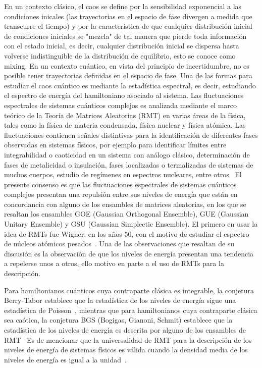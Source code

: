 \documentclass[spanish,titlepage,table]{practicas}
\begin{document}
En un contexto clásico, el caos se define por la sensibilidad exponencial a las condiciones inicales 
(las trayectorias en el espacio de fase divergen a medida que transcurre el tiempo) y por la característica de que cualquier distribución inicial de condiciones 
iniciales se "mezcla" de tal manera que pierde toda información con el estado inicial, es decir, cualquier distribución inicial se dispersa hasta volverse indistinguible de la distribución de equilibrio, esto se conoce como mixing. En un contexto cuántico, en vista del principio de incertidumbre, no es posible tener 
trayectorias definidas en el espacio de fase. Una de las formas para estudiar el caos cuántico es mediante la estadística espectral, es decir, estudiando el espectro de energía del hamiltoniano asociado al sistema.
Las fluctuaciones espectrales de sistemas cuánticos complejos es analizada mediante 
el marco teórico de la Teoría de Matrices Aleatorias (RMT) en varias áreas de la física, 
tales como la física de materia condensada, física nuclear y física atómica.
Las fluctuaciones contienen señales distintivas para la identificación de diferentes fases observadas 
en sistemas físicos, por ejemplo para identificar límites entre integrabilidad o caoticidad en un sistema con análogo clásico,
determinación de fases de metalicidad o insulación, fases localizadas o termalizadas de sistemas de muchos cuerpos, estudio de regímenes en espectros nucleares, entre otros~\cite{Tekur2020}
El presente consenso es que las fluctuaciones espectrales de sistemas cuánticos complejos presentan 
una repulsión entre sus niveles de energía que están en concordancia con alguno de los ensambles de matrices 
aleatorias, en los que se resaltan los ensambles GOE (Gaussian Orthogonal Ensemble), GUE (Gaussian Unitary Ensemble) y GSU (Gaussian Simplectic Ensemble).
El primero en usar la idea de RMTs fue Wigner, en los años 50, con el motivo de estudiar el espectro de núcleos atómicos pesados~\cite{Wigner1955}.
Una de las observaciones que resaltan de su discusión es la observación de que los niveles de energía presentan una tendencia a repelerse unos a otros, 
ello motivo en parte a el uso de RMTs para la descripción.


Para hamiltonianos cuánticos cuya contraparte clásica es integrable, la conjetura Berry-Tabor establece que 
la estadística de los niveles de energía sigue una estadística de Poisson~\cite{BerryTabor1977}, mientras que para hamiltonianos 
cuya contraparte clásica sea caótica, la conjetura BGS (Bogigas, Gianoni, Schmit) establece que la estadística de los niveles de energía es descrita 
por alguno de los ensambles de RMT~\cite{Atas_2013}
Es de mencionar que la universalidad de RMT para la descripción de los niveles de energía de sistemas físicos 
es válida cuando la densidad media de los niveles de energía es igual a la unidad~\cite{Atas_2013}.
\end{document}
